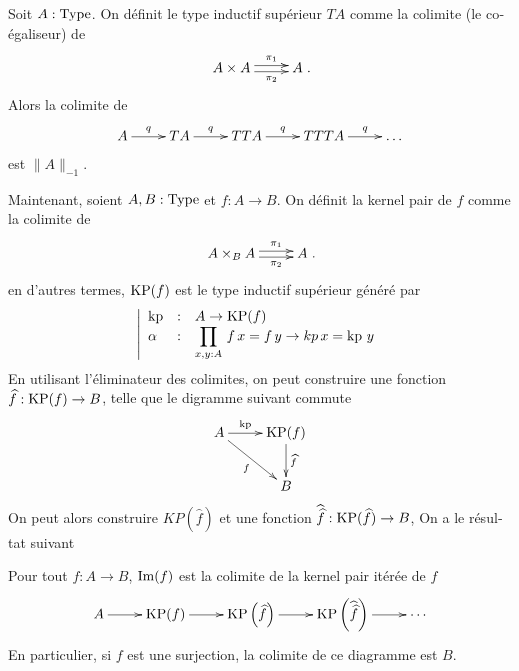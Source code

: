 \begin{otherlanguage}{french}
\begin{prop}

  Soit $A:\operatorname{Type}$. On définit le type inductif supérieur $TA$ comme la
  colimite (le coégaliseur) de
  \[ \xymatrix{ A\times A \ar@<-.5ex>[r]_-{\pi_2}
      \ar@<.5ex>[r]^-{\pi_1} & A }.\]
  Alors la colimite de
  \[ \xymatrix{
      A \ar[r]^-q& TA \ar[r]^-q& TTA \ar[r]^-q& TTTA \ar[r]^-q& \dots
    }\]
  est $\|A\|_{-1}$.
\end{prop}

Maintenant, soient $A,B:\operatorname{Type}$ et $f:A\to B$. On définit la kernel pair de $f$
comme la colimite de \[ \xymatrix{ A\times_B A \ar@<-.5ex>[r]_-{\pi_2}
      \ar@<.5ex>[r]^-{\pi_1} & A }.\]
en d'autres termes, $\operatorname{KP}(f)$ est le type inductif supérieur généré par
\[\left|
    \begin{array}{lll}
      \operatorname{kp} &:& A\to \operatorname{KP}(f) \\
      \alpha &:& \displaystyle{\prod_{x,y:A}\, f\, x = f\, y \to kp\,x=\operatorname{kp}\,y}
    \end{array}
  \right.\]
En utilisant l'éliminateur des colimites, on peut construire une
fonction $\widehat
f:\operatorname{KP}(f) \to B$, telle que le digramme suivant commute
\[\xymatrix{
    A \ar[r]^-{\kp} \ar[rd]_-f & \KP(f) \ar[d]^-{\widehat f} \\
    &B
}\]
On peut alors construire
$KP(\widehat f)$ et une fonction $\widehat{\widehat
  f}:\operatorname{KP}(\widehat f) \to B$, \etc{}
On a le résultat suivant
\begin{prop}
  Pour tout $f:A\to B$, $\operatorname{Im}(f)$ est la colimite de la kernel pair
  itérée de $f$
\[\xymatrix{
  A \ar[r] & \KP(f) \ar[r] & \KP\left(\widehat f\right) \ar[r]& \KP\left(\widehat{\widehat f}\right) \ar[r]& \cdots
}\]
En particulier, si $f$ est une surjection, la colimite de ce diagramme
est $B$.
\end{prop}


\end{otherlanguage}
